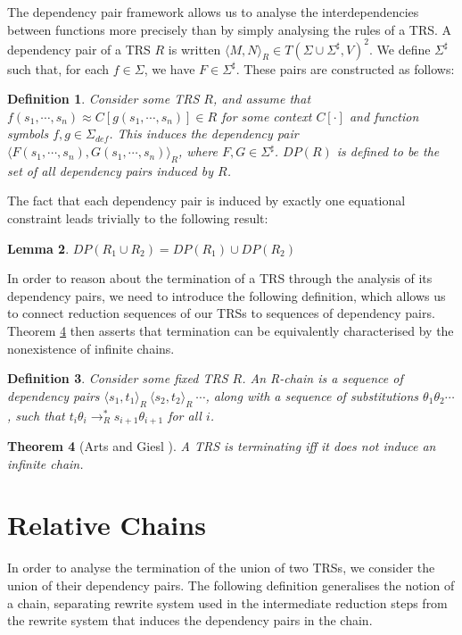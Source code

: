 \documentclass{article}
\newtheorem{theorem}{Theorem}[section]
\newtheorem{lemma}[theorem]{Lemma}
\newtheorem{definition}[theorem]{Definition}
\newcommand{\dpair}[2]{\langle #1, #2 \rangle}
\begin{document}
The dependency pair framework \cite{arts2000dependency} allows us to analyse the interdependencies between functions more precisely than by simply analysing the rules of a TRS. A dependency pair of a TRS $R$ is written $\dpair{M}{N}_R \in T(\Sigma \cup \Sigma^\sharp, V)^2$. We define $\Sigma^\sharp$ such that, for each $f \in \Sigma$, we have $F \in \Sigma^\sharp$. These pairs are constructed as follows:
\begin{definition}
    Consider some TRS $R$, and assume that $f(s_1, \cdots, s_n) \approx C[g(s_1, \cdots, s_n)] \in R$ for some context $C[\cdot]$ and function symbols $f, g \in \Sigma_{def}$. This induces the \emph{dependency pair} $\dpair{F (s_1, \cdots, s_n)}{G(s_1, \cdots, s_n)}_R $, where $F, G \in \Sigma^\sharp$. $DP(R)$ is defined to be the set of all dependency pairs induced by $R$.
\end{definition}
The fact that each dependency pair is induced by exactly one equational constraint leads trivially to the following result:
\begin{lemma} \label{thm:dep_pair_mod}
    $DP(R_1 \cup R_2) = DP(R_1) \cup DP(R_2)$
\end{lemma}
In order to reason about the termination of a TRS through the analysis of its dependency pairs, we need to introduce the following definition, which allows us to connect reduction sequences of our TRSs to sequences of dependency pairs. Theorem \ref{thm:no_infinite_chains} then asserts that termination can be equivalently characterised by the nonexistence of infinite chains.
\begin{definition}
    Consider some fixed TRS $R$. An \emph{R-chain} is a sequence of dependency pairs $\dpair{s_1}{t_1}_R ~ \dpair{s_2}{t_2}_R ~ \cdots$, along with a sequence of substitutions $\theta_1 \theta_2 \cdots$, such that $t_i \theta_i \rightarrow_R^* s_{i+1}\theta_{i+1}$ for all $i$.
\end{definition}
\begin{theorem}[Arts and Giesl \cite{arts2000dependency}]\label{thm:no_infinite_chains}
    A TRS is terminating iff it does not induce an infinite chain.
\end{theorem} 



\section{Relative Chains}

In order to analyse the termination of the union of two TRSs, we consider the union of their dependency pairs. The following definition generalises the notion of a chain, separating rewrite system used in the intermediate reduction steps from the rewrite system that induces the dependency pairs in the chain.
\end{document}
